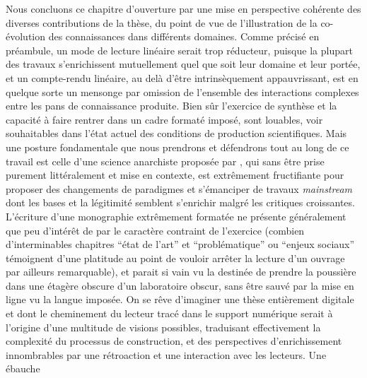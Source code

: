 Nous concluons ce chapitre d'ouverture par une mise en perspective cohérente des diverses contributions de la thèse, du point de vue de l'illustration de la co-évolution des connaissances dans différents domaines. Comme précisé en préambule, un mode de lecture linéaire serait trop réducteur, puisque la plupart des travaux s'enrichissent mutuellement quel que soit leur domaine et leur portée, et un compte-rendu linéaire, au delà d'être intrinsèquement appauvrissant, est en quelque sorte un mensonge par omission de l'ensemble des interactions complexes entre les pans de connaissance produite. Bien sûr l'exercice de synthèse et la capacité à faire rentrer dans un cadre formaté imposé, sont louables, voir souhaitables dans l'état actuel des conditions de production scientifiques. Mais une posture fondamentale que nous prendrons et défendrons tout au long de ce travail est celle d'une science anarchiste proposée par , qui sans être prise purement littéralement et mise en contexte, est extrêmement fructifiante pour proposer des changements de paradigmes et s'émanciper de travaux \emph{mainstream} dont les bases et la légitimité semblent s'enrichir malgré les critiques croissantes. L'écriture d'une monographie extrêmement formatée ne présente généralement que peu d'intérêt de par le caractère contraint de l'exercice (combien d'interminables chapitres ``état de l'art'' et ``problématique'' ou ``enjeux sociaux'' témoignent d'une platitude au point de vouloir arrêter la lecture d'un ouvrage par ailleurs remarquable), et parait si vain vu la destinée de prendre la poussière dans une étagère obscure d'un laboratoire obscur, sans être sauvé par la mise en ligne vu la langue imposée. On se rêve d'imaginer une thèse entièrement digitale et dont le cheminement du lecteur tracé dans le support numérique serait à l'origine d'une multitude de visions possibles, traduisant effectivement la complexité du processus de construction, et des perspectives d'enrichissement innombrables par une rétroaction et une interaction avec les lecteurs. Une ébauche



